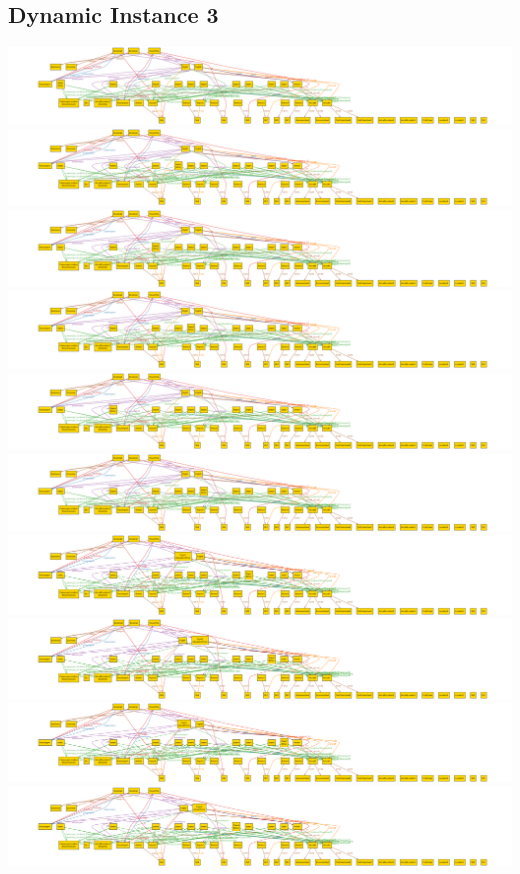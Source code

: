 \documentclass[12pt,a4paper,titlepage]{article}
\begin{document}
\subsection{Dynamic Instance 3}
\includegraphics[width=\textwidth]{dynamic_instance_3_time_0}
\includegraphics[width=\textwidth]{dynamic_instance_3_time_1}
\includegraphics[width=\textwidth]{dynamic_instance_3_time_2}
\includegraphics[width=\textwidth]{dynamic_instance_3_time_3}
\includegraphics[width=\textwidth]{dynamic_instance_3_time_4}
\includegraphics[width=\textwidth]{dynamic_instance_3_time_5}
\includegraphics[width=\textwidth]{dynamic_instance_3_time_6}
\includegraphics[width=\textwidth]{dynamic_instance_3_time_7}
\includegraphics[width=\textwidth]{dynamic_instance_3_time_8}
\includegraphics[width=\textwidth]{dynamic_instance_3_time_9}
\end{document}
